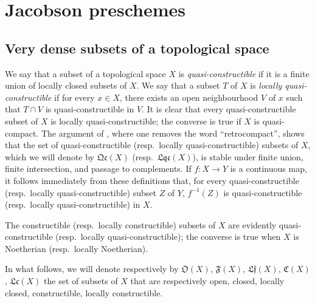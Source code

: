 \section{Jacobson preschemes}
\label{section:IV.10}


\subsection{Very dense subsets of a topological space}
\label{subsection:IV.10.1}


\begin{env}[10.1.1]
\label{IV.10.1.1}
We say that a subset of a topological space $X$ is \emph{quasi-constructible} if it is a finite union of locally closed subsets of $X$.
We say that a subset $T$ of $X$ is \emph{locally quasi-constructible} if for every $x\in X$, there exists an open neighbourhood $V$ of $x$ such that $T\cap V$ is quasi-constructible in $V$.
It is clear that every quasi-constructible subset of $X$ is locally quasi-constructible; the converse is true if $X$ is quasi-compact.
The argument of , where one removes the word ``retrocompact'', shows that the set of quasi-constructible (resp.\ locally quasi-constructible) subsets of $X$, which we will denote by $\mathfrak{Qc}(X)$ (resp.\ $\mathfrak{Lqc}(X)$), is stable under finite union, finite intersection, and passage to complements.
If $f:X\to Y$ is a continuous map, it follows immediately from these definitions that, for every quasi-constructible (resp.\ locally quasi-constructible) subset $Z$ of $Y$, $f^{-1}(Z)$ is quasi-constructible (resp.\ locally quasi-constructible) in $X$.

The constructible (resp.\ locally constructible) subsets of $X$ are evidently quasi-constructible (resp.\ locally quasi-constructible); the converse is true when $X$ is Noetherian (resp.\ locally Noetherian).

In what follows, we will denote respectively by $\mathfrak{O}(X)$, $\mathfrak{F}(X)$, $\mathfrak{Lf}(X)$, $\mathfrak{C}(X)$, $\mathfrak{Lc}(X)$ the set of subsets of $X$ that are respectively open, closed, locally closed, constructible, locally constructible.
\end{env}


